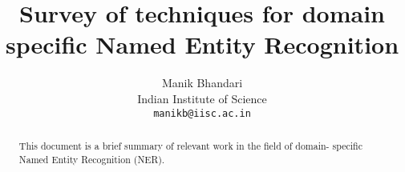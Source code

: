 \documentclass[11pt,a4paper]{article}
\title{Survey of techniques for domain specific Named Entity Recognition}
\author{Manik Bhandari \\
  Indian Institute of Science \\
  \texttt{manikb@iisc.ac.in} \\
  }
\date{}
\begin{document}
\maketitle

\begin{abstract}
    This document is a brief summary of relevant work in the field of domain-
    specific Named Entity Recognition (NER).
\end{abstract}










\end{document}

